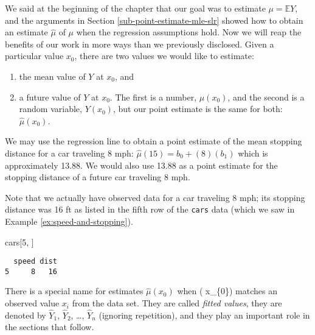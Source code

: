 \documentclass[]{book}
\newenvironment{Shaded}{\begin{snugshade}}{\end{snugshade}}
\newcommand{\DecValTok}[1]{\textcolor[rgb]{0.00,0.00,0.81}{{#1}}}
\newcommand{\NormalTok}[1]{{#1}}
\providecommand{\tightlist}{%
  \setlength{\itemsep}{0pt}\setlength{\parskip}{0pt}}
\numberwithin{equation}{chapter}
\numberwithin{figure}{chapter}
\theoremstyle{plain}
\theoremstyle{definition}
\theoremstyle{remark}
\theoremstyle{definition}
\theoremstyle{definition}
\theoremstyle{remark}
\let\BeginKnitrBlock\begin \let\EndKnitrBlock\end
\begin{document}
We said at the beginning of the chapter that our goal was to estimate
\(\mu = \mathbb{E} Y\), and the arguments in Section
\ref{sub-point-estimate-mle-slr} showed how to obtain an estimate
\(\hat{\mu}\) of \(\mu\) when the regression assumptions hold. Now we
will reap the benefits of our work in more ways than we previously
disclosed. Given a particular value \(x_{0}\), there are two values we
would like to estimate:

\begin{enumerate}
\def\labelenumi{\arabic{enumi}.}
\tightlist
\item
  the mean value of \(Y\) at \(x_{0}\), and
\item
  a future value of \(Y\) at \(x_{0}\). The first is a number,
  \(\mu(x_{0})\), and the second is a random variable, \(Y(x_{0})\), but
  our point estimate is the same for both: \(\hat{\mu}(x_{0})\).
\end{enumerate}

\bigskip

\BeginKnitrBlock{example}
\protect\hypertarget{ex:regline-cars-pe-8mph}{}{\label{ex:regline-cars-pe-8mph}}We
may use the regression line to obtain a point estimate of the mean
stopping distance for a car traveling 8 mph:
\(\hat{\mu}(15) = b_{0} + (8) (b_{1})\) which is approximately 13.88. We
would also use 13.88 as a point estimate for the stopping distance of a
future car traveling 8 mph.
\EndKnitrBlock{example}

Note that we actually have observed data for a car traveling 8 mph; its
stopping distance was 16 ft as listed in the fifth row of the
\texttt{cars} data (which we saw in Example
\ref{ex:speed-and-stopping}).

\begin{Shaded}
\begin{Highlighting}[]
\NormalTok{cars[}\DecValTok{5}\NormalTok{, ]}
\end{Highlighting}
\end{Shaded}

\begin{verbatim}
  speed dist
5     8   16
\end{verbatim}

There is a special name for estimates \(\hat{\mu}(x_{0})\) when (
x\_\{0\}) matches an observed value \(x_{i}\) from the data set. They
are called \emph{fitted values}, they are denoted by \(\hat{Y}_{1}\),
\(\hat{Y}_{2}\), \ldots{}, \(\hat{Y}_{n}\) (ignoring repetition), and
they play an important role in the sections that follow.
\end{document}
